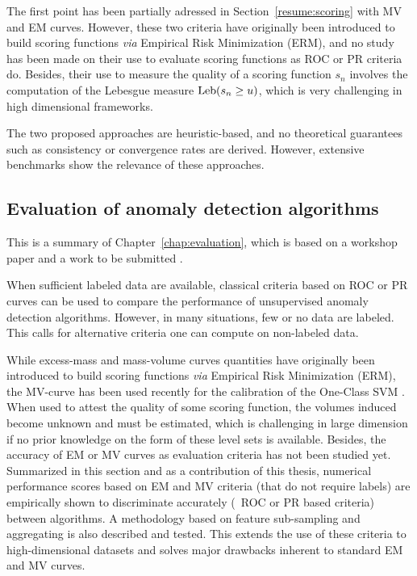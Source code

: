 The first point has been partially adressed in Section~\ref{resume:scoring} with MV and EM curves.
However, these two criteria have originally been introduced to build scoring functions \emph{via} Empirical Risk Minimization (ERM), and no study has been made on their use to evaluate scoring functions as ROC or PR criteria do.
Besides, their use to measure the quality of a scoring function $s_n$ involves the computation of the Lebesgue measure  $\text{Leb}(s_n \ge u)$, which is very challenging in high dimensional frameworks. 

The two proposed approaches are heuristic-based, and no theoretical guarantees such as consistency or convergence rates are derived. However, extensive benchmarks show the relevance of these approaches.

\subsection{Evaluation of anomaly detection algorithms}
\label{resume:evaluation}
This is a summary of Chapter~\ref{chap:evaluation}, which is based on a workshop paper \citep{ICMLworkshop16} and a work to be submitted \citep{NIPS16evaluation}.


When sufficient labeled data are available, classical criteria based on ROC \citep{Provost1997, Provost1998, Fawcett2006} or PR \citep{Davis2006, Clemencon2009} curves can be used to compare the performance of unsupervised anomaly detection algorithms. However, in many situations, few or no data are labeled. This calls for alternative criteria one can compute on non-labeled data.

While excess-mass and mass-volume curves quantities have originally been introduced to build scoring functions \emph{via}
Empirical Risk Minimization (ERM), the MV-curve has been used recently for the calibration of the One-Class SVM \citep{Thomas2015}.
When used to attest the quality of some scoring function, the volumes induced become unknown and must be estimated, which is challenging in large dimension if no prior knowledge on the form of these level sets is available.
%
Besides, the accuracy of EM or MV curves as evaluation criteria has not been studied yet.
%
Summarized in this section and as a contribution of this thesis, numerical performance scores based on EM and MV criteria (that do not require labels) are empirically shown to discriminate accurately (\wrt~ROC or PR based criteria) between algorithms.
A methodology based on feature sub-sampling and aggregating is also described and tested. This extends the use of these criteria to high-dimensional datasets and solves major drawbacks inherent to standard EM and MV curves.

